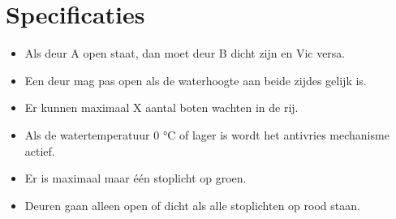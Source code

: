 \documentclass{article}
\begin{document}
\section{Specificaties} %

\begin{itemize}
\item Als deur A open staat, dan moet deur B dicht zijn en Vic versa.
\item Een deur mag pas open als de waterhoogte aan beide zijdes gelijk is.
\item Er kunnen maximaal X aantal boten wachten in de rij.
\item Als de watertemperatuur 0 °C of lager is wordt het antivries mechanisme actief.
\item Er is maximaal maar één stoplicht op groen.
\item Deuren gaan alleen open of dicht als alle stoplichten op rood staan.
\end{itemize}

\vskip2cm


\clearpage %
\end{document}
